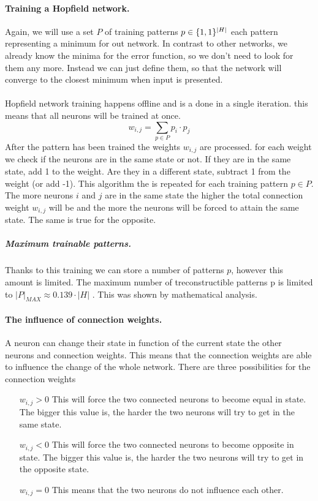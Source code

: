 \documentclass[pdftex,a4paper,12pt,twoside]{report}
\theoremstyle{plain} \newtheorem{theorem}{Theorem} \newtheorem{proposition}{Proposition} \newtheorem{lemma}{Lemma} \newtheorem*{corollary}{Corollary}
\theoremstyle{definition} \newtheorem{definition}{Definition} \newtheorem{conjecture}{Conjecture} \newtheorem*{example}{Example} \newtheorem{algorithm}{Algorithm}
\theoremstyle{remark} \newtheorem*{remark}{Remark} \newtheorem*{note}{Note} \newtheorem{case}{Case}
\begin{document}
\paragraph{Training a Hopfield network.}
Again, we will use a set $P$ of  training patterns $p \in \{\-1,1\}^{|H|}$ each pattern representing a minimum for out network. In contrast to other networks, we already know the minima for the error function, so we don't need to look for them any more. Instead we can just define them, so that the network will converge to the closest minimum when input is presented.\\\\Hopfield network training happens offline and is a done in a single iteration. this means that all neurons will be trained at once.
\begin{equation}
w_{i,j} = \sum_{p \in P} p_i \cdot p_j
\end{equation}
After the pattern has been trained the weights $w_{i,j}$ are processed. for each weight we check if the neurons are in the same state or not. If they are in the same state, add 1 to the weight. Are they in a different state, subtract 1 from the weight (or add -1). This algorithm the is repeated for each training pattern $p \in P$. The more neurons $i$ and $j$ are in the same state the higher the total connection weight $w_{i,j}$ will be and the more the neurons will be forced to attain the same state. The same is true for the opposite.
\subparagraph{Maximum trainable patterns.}
Thanks to this training we can store a number of patterns $p$, however this amount is limited. The maximum number of treconstructible patterns p is limited to $|P|_{MAX} \approx  0.139 \cdot |H|$ . This was shown by mathematical analysis.
\paragraph{The influence of connection weights.}
A neuron can change their state in function of the current state the other neurons and connection weights. This means that the connection weights are able to influence the change of the whole network. There are three possibilities for the connection weights
\begin{itemize}
\item[$w_{i,j} > 0 $] This will force the two connected neurons to become equal in state. The bigger this value is, the harder the two neurons will try to get in the same state.
\item[$w_{i,j} < 0 $] This will force the two connected neurons to become opposite in state. The bigger this value is, the harder the two neurons will try to get in the opposite state.
\item[$w_{i,j} = 0 $] This means that the two neurons do not influence each other.
\end{itemize}
\end{document}
